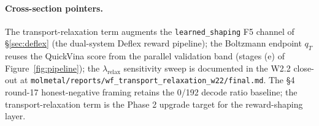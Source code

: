 \paragraph{Cross-section pointers.}
The transport-relaxation term augments the \texttt{learned\_shaping}
F5 channel of \S\ref{sec:deflex} (the dual-system Deflex reward
pipeline); the Boltzmann endpoint $q_{T}$ reuses the QuickVina
score from the parallel validation band (stages (e) of
Figure~\ref{fig:pipeline}); the $\lambda_{\mathrm{relax}}$ sensitivity
sweep is documented in the W2.2 close-out at
\texttt{molmetal/reports/wf\_transport\_relaxation\_w22/final.md}.
The §4 round-17 honest-negative framing retains the 0/192 decode
ratio baseline; the transport-relaxation term is the Phase 2 upgrade
target for the reward-shaping layer.

\makeatletter
\let\cite\WForigCiteTransRelax
\makeatother